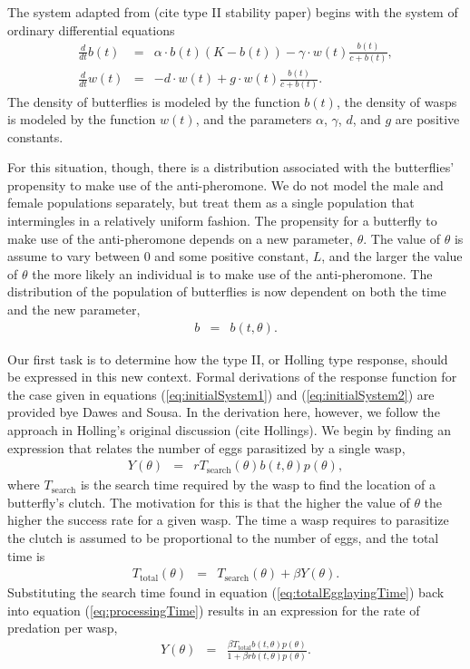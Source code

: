\documentclass[12pt]{article}
\begin{document}
The system adapted from (cite type II stability paper) begins with the
system of ordinary differential equations
\begin{eqnarray}
  \label{eq:initialSystem1}
  \frac{d}{dt} b(t) & = & \alpha \cdot b(t) (K - b(t)) - \gamma \cdot w(t) \frac{b(t)}{c+b(t)}, \\
  \label{eq:initialSystem2}
  \frac{d}{dt} w(t) & = & -d \cdot w(t) + g \cdot w(t) \frac{b(t)}{c+b(t)}.
\end{eqnarray}
The density of butterflies is modeled by the function $b(t)$, the
density of wasps is modeled by the function $w(t)$, and the parameters
$\alpha$, $\gamma$, $d$, and $g$ are positive constants. 

For this situation, though, there is a distribution associated with
the butterflies' propensity to make use of the anti-pheromone. We do
not model the male and female populations separately, but treat them
as a single population that intermingles in a relatively uniform
fashion. The propensity for a butterfly to make use of the
anti-pheromone depends on a new parameter, $\theta$. The value of
$\theta$ is assume to vary between $0$ and some positive constant,
$L$, and the larger the value of $\theta$ the more likely an
individual is to make use of the anti-pheromone. The distribution of
the population of butterflies is now dependent on both the time and
the new parameter,
\begin{eqnarray}
  b & = & b(t,\theta).
\end{eqnarray}

Our first task is to determine how the type II, or Holling type
response, should be expressed in this new context. Formal derivations
of the response function for the case given in equations
(\ref{eq:initialSystem1}) and (\ref{eq:initialSystem2}) are provided
bye Dawes and Sousa\cite{DAWES201311}.
In the derivation here, however,
we follow the approach in Holling's original discussion (cite
Hollings). We begin by finding an expression that relates the number
of eggs parasitized by a single wasp,
\begin{eqnarray}
  \label{eq:processingTime}
  Y(\theta) & = & r T_{\mathrm{search}}(\theta) b(t,\theta) p(\theta),
\end{eqnarray}
where $T_{\mathrm{search}}$ is the search time required by the wasp to
find the location of a butterfly's clutch. The motivation for this is
that the higher the value of $\theta$ the higher the success rate for
a given wasp.  The time a wasp requires to parasitize the clutch is
assumed to be proportional to the number of eggs, and the total time
is
\begin{eqnarray}
  \label{eq:totalEgglayingTime}
  T_{\mathrm{total}}(\theta) & = & T_{\mathrm{search}}(\theta) + \beta Y(\theta).
\end{eqnarray}
Substituting the search time found in equation
(\ref{eq:totalEgglayingTime}) back into equation
(\ref{eq:processingTime}) results in an expression for the rate of
predation per wasp,
\begin{eqnarray}
  \label{eq:waspPredationRate}
  Y(\theta) & = & \frac{\beta T_{\mathrm{total}} b(t,\theta) p(\theta)}{1 + \beta r b(t,\theta) p(\theta)}.
\end{eqnarray}
\end{document}
